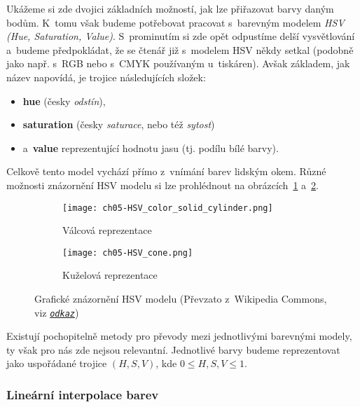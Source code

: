 Ukážeme si zde dvojici základních možností, jak lze přiřazovat barvy daným bodům. K~tomu však budeme potřebovat pracovat s~barevným modelem \emph{HSV (Hue, Saturation, Value)}. S~prominutím si zde opět odpustíme delší vysvětlování a~budeme předpokládat, že se čtenář již s~modelem HSV někdy setkal (podobně jako např. s~RGB nebo s~CMYK používaným u~tiskáren). Avšak základem, jak název napovídá, je trojice následujících složek:
\begin{itemize}
    \item \textbf{hue} (česky \emph{odstín}),
    \item \textbf{saturation} (česky \emph{saturace}, nebo též \emph{sytost})
    \item a~\textbf{value} reprezentující hodnotu jasu (tj. podílu bílé barvy).
\end{itemize}
Celkově tento model vychází přímo z~vnímání barev lidským okem. Různé možnosti znázornění HSV modelu si lze prohlédnout na obrázcích~\ref{subfig:hsv-valcova-reprezentace} a~\ref{subfig:hsv-kuzelova-reprezentace}.
\begin{figure}[h]
    \centering
    \begin{subfigure}{0.45\textwidth}
        \centering
        \texttt{[image: ch05-HSV\_color\_solid\_cylinder.png]}
        \caption{Válcová reprezentace}
        \label{subfig:hsv-valcova-reprezentace}
    \end{subfigure}
    \qquad
    \begin{subfigure}{0.45\textwidth}
        \centering
        \texttt{[image: ch05-HSV\_cone.png]}
        \caption{Kuželová reprezentace}
        \label{subfig:hsv-kuzelova-reprezentace}
    \end{subfigure}
    \caption[Grafické znázornění HSV modelu]{Grafické znázornění HSV modelu (Převzato z~Wikipedia Commons, viz \href{https://cs.wikipedia.org/wiki/HSV}{\texttt{\textit{odkaz}}})}
    \label{fig:hsv}
\end{figure}

Existují pochopitelně metody pro převody mezi jednotlivými barevnými modely, ty však pro nás zde nejsou relevantní. Jednotlivé barvy budeme reprezentovat jako uspořádané trojice $(H,S,V)$, kde $0\leqslant H,S,V\leqslant 1$.

\subsubsection{Lineární interpolace barev}

